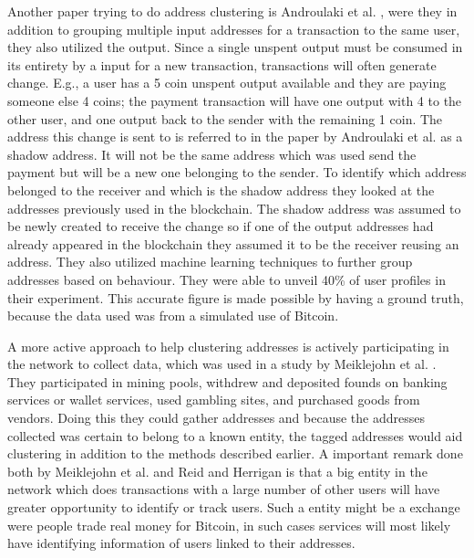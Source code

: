 Another paper trying to do address clustering is Androulaki et al. \cite{androulaki2013evaluating}, were they in addition to grouping multiple input addresses for a transaction to the same user, they also utilized the output. Since a single unspent output must be consumed in its entirety by a input for a new transaction, transactions will often generate change. E.g., a user has a 5 coin unspent output available and they are paying someone else 4 coins; the payment transaction will have one output with 4 to the other user, and one output back to the sender with the remaining 1 coin. The address this change is sent to is referred to in the paper by Androulaki et al. as a shadow address. It will not be the same address which was used send the payment but will be a new one belonging to the sender.
To identify which address belonged to the receiver and which is the shadow address they looked at the addresses previously used in the blockchain. The shadow address was assumed to be newly created to receive the change so if one of the output addresses had already appeared in the blockchain they assumed it to be the receiver reusing an address. They also utilized machine learning techniques to further group addresses based on behaviour. They were able to unveil 40\% of user profiles in their experiment. This accurate figure is made possible by having a ground truth, because the data used was from a simulated use of Bitcoin.

A more active approach to help clustering addresses is actively participating in the network to collect data, which was used in a study by Meiklejohn et al. \cite{meiklejohn2013fistful}. They participated in mining pools, withdrew and deposited founds on banking services or wallet services, used gambling sites, and purchased goods from vendors. Doing this they could gather addresses and because the addresses collected was certain to belong to a known entity, the tagged addresses would aid clustering in addition to the methods described earlier.
A important remark done both by Meiklejohn et al.\cite{meiklejohn2013fistful} and Reid and Herrigan \cite{reid2013analysis} is that a big entity in the network which does transactions with a large number of other users will have greater opportunity to identify or track users. Such a entity might be a exchange were people trade real money for Bitcoin, in such cases services will most likely have identifying information of users linked to their addresses.

